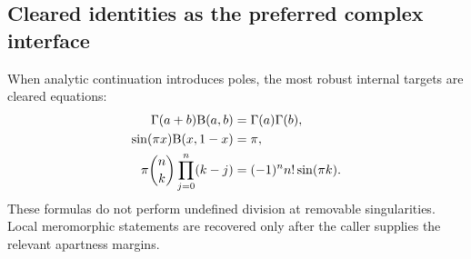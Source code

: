 \subsection{Cleared identities as the preferred complex interface}

When analytic continuation introduces poles, the most robust internal targets are cleared equations:
\begin{align*}
 \Gamma(a+b)\mathrm B(a,b)&=\Gamma(a)\Gamma(b),\\
 \sin(\pi x)\mathrm B(x,1-x)&=\pi,\\
 \pi\binom nk\prod_{j=0}^n(k-j)
 &=(-1)^n n!\sin(\pi k).
\end{align*}
These formulas do not perform undefined division at removable singularities.  Local meromorphic statements are recovered only after the caller supplies the relevant apartness margins.
